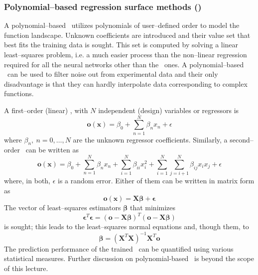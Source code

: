 \documentclass{vki_ls}
\newcommand{\vect}[1]{\bm{#1}}
\begin{document}
%
\subsubsection*{Polynomial--based regression surface methods (\RSM)}
\label{ss:rsm}

A polynomial--based \RSM\ utilizes polynomials of user--defined order to model the function landscape. Unknown coefficients are introduced and their value set that best fits the training data is sought. This set is computed by solving a linear least--squares problem, i.e. a much easier process than the non--linear regression required for all the neural networks other than the \RBF\ ones. A polynomial--based \RSM\ can be used to filter noise out from experimental data and their only disadvantage is that they can hardly interpolate data corresponding to complex functions.

A first--order (linear) \RSM, with $N$ independent (design) variables or regressors is
%
\begin{equation}
   \vect{o(\vect{x})} = \beta_0 + \sum_{n=1}^N \beta_n x_n + \epsilon
\end{equation}
%
where $\beta_n,~n=0,\dots,N$ are the unknown regressor coefficients. 
Similarly, a second--order \RSM\ can be written as
%
\begin{equation}
   \vect{o(\vect{x})} = \beta_0 
			+ \sum_{n=1}^N \beta_n x_n
			+ \sum_{i=1}^N \beta_{ii} x_i^2 
			+ \sum_{i=1}^N \sum_{j=i+1}^N \beta_{ij} x_i x_j 
		        + \epsilon
\end{equation}
%
where, in both, $\epsilon$ is a random error.
Either of them can be written in matrix form as
\begin{equation}
   \vect{o(\vect{x})} = \vect{X} \vect{\beta} + \vect{\epsilon}
\end{equation}
%
The vector of least--squares estimators $\vect{\beta}$ that minimizes 
%
\begin{equation}
   \vect{\epsilon}^T \vect{\epsilon} =  (\vect{o} - \vect{X} \vect{\beta})^T
					(\vect{o} - \vect{X} \vect{\beta})  
\end{equation}
%
is sought; this leads to the least--squares normal equations and, though them, to
%
\begin{equation}
   \vect{\beta} =  (\vect{X}^T \vect{X})^{-1} \vect{X}^T \vect{o}
\end{equation}
%
The prediction performance of the trained \RSM\ can be quantified using various statistical measures. Further discussion on polynomial-based \RSM\ is beyond the scope of this lecture.
%
\end{document}
